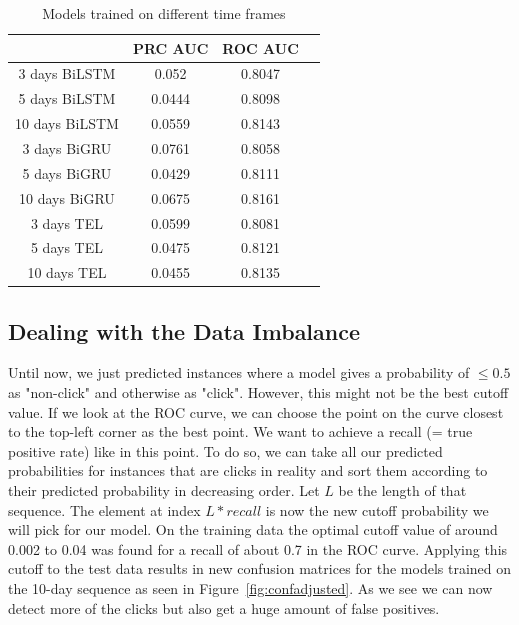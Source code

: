 \documentclass[utf8x]{ctexart}
\begin{document}
\begin{table}[ht]
  \centering
  \caption{Models trained on different time frames}
  \label{tab:time_comparison}
  \begin{tabular}{c|ccc}
                   & PRC AUC & ROC AUC \\
    \hline
    3 days BiLSTM  & 0.052   & 0.8047  \\
    5 days BiLSTM  & 0.0444  & 0.8098  \\
    10 days BiLSTM & 0.0559  & 0.8143  \\
    \hline
    3 days BiGRU   & 0.0761  & 0.8058  \\
    5 days BiGRU   & 0.0429  & 0.8111  \\
    10 days BiGRU  & 0.0675  & 0.8161  \\
    \hline
    3 days TEL     & 0.0599  & 0.8081  \\
    5 days TEL     & 0.0475  & 0.8121  \\
    10 days TEL    & 0.0455  & 0.8135  \\
  \end{tabular}
\end{table}

\subsection{Dealing with the Data Imbalance}

Until now, we just predicted instances where a model gives a probability of $\leq 0.5$ as "non-click" and otherwise as "click". However, this might not be the best cutoff value. If we look at the ROC curve, we can choose the point on the curve closest to the top-left corner as the best point. We want to achieve a recall (= true positive rate) like in this point. To do so, we can take all our predicted probabilities for instances that are clicks in reality and sort them according to their predicted probability in decreasing order. Let $L$ be the length of that sequence. The element at index $L * recall$ is now the new cutoff probability we will pick for our model. On the training data the optimal cutoff value of around 0.002 to 0.04 was found for a recall of about 0.7 in the ROC curve.
Applying this cutoff to the test data results in new confusion matrices for the models trained on the 10-day sequence as seen in Figure~\ref{fig:confadjusted}. As we see we can now detect more of the clicks but also get a huge amount of false positives.
\end{document}
